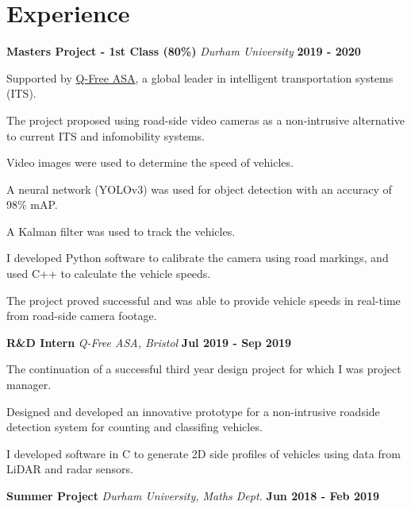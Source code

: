 \documentclass[a4paper, 11pt, hidelinks]{article}
\newcommand{\xp}[3]{
	\vspace{0.25em}
	\textbf{\large#1} \quad \emph{\large#2} \hfill \textbf{\large#3}
}
\begin{document}
	\begin{minipage}{0.587\textwidth}
		\vspace{-0.25em}
		
		\section{Experience}
		\xp{Masters Project - 1st Class (80\%)}{Durham University}{2019 - 2020}
		\begin{itemise}
			\item Supported by \href{https://www.q-free.com/}{Q-Free ASA}, a global leader in intelligent transportation systems (ITS).
			\item The project proposed using road-side video cameras as a non-intrusive alternative to current ITS and infomobility systems.
			\item Video images were used to determine the speed of vehicles.
			\item A neural network (YOLOv3) was used for object detection with an accuracy of 98\% mAP.
			\item A Kalman filter was used to track the vehicles.
			\item I developed Python software to calibrate the camera using road markings, and used C++ to calculate the vehicle speeds.
			\item The project proved successful and was able to provide vehicle speeds in real-time from road-side camera footage.
			\hfill
			\href{https://www.francisgurr.com/pages/masters_project/masters_project.html}{\faExternalLink}
		\end{itemise}
		\xp{R\&D Intern}{Q-Free ASA, Bristol}{Jul 2019 - Sep 2019}
		\begin{itemise}
			\item The continuation of a successful third year design project for which I was project manager.
			\item Designed and developed an innovative prototype for a non-intrusive roadside detection system for counting and classifing vehicles.
			\item I developed software in C to generate 2D side profiles of vehicles using data from LiDAR and radar sensors.
			\hfill
			\href{https://www.francisgurr.com/pages/qfree_internship/qfree_internship.html}{\faExternalLink}
		\end{itemise}
		\xp{Summer Project}{Durham University, Maths Dept.}{Jun 2018 - Feb 2019}
		\begin{itemise}

\end{itemise}
\end{minipage}
\end{document}
